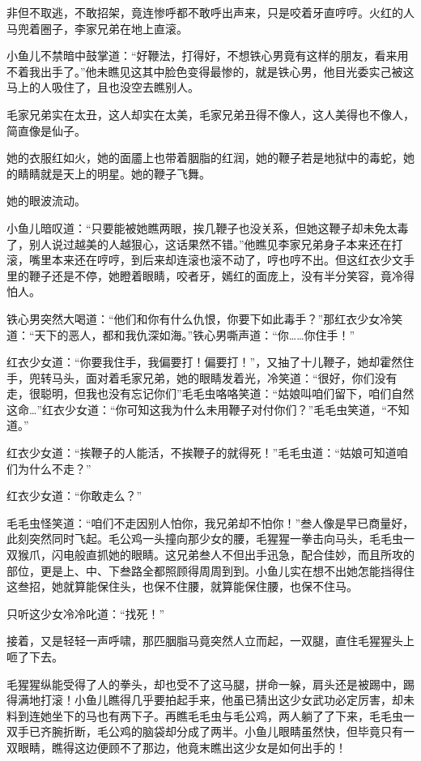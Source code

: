 \documentclass[12pt,oneside]{book}
\begin{document}
非但不取逃，不敢招架，竟连惨呼都不敢呼出声来，只是咬着牙直哼哼。火红的人马兜着圈子，李家兄弟在地上直滚。

小鱼儿不禁暗中鼓掌道：``好鞭法，打得好，不想铁心男竟有这样的朋友，看来用不着我出手了。''他未瞧见这其中脸色变得最惨的，就是铁心男，他目光委实己被这马上的人吸住了，且也没空去瞧别人。

毛家兄弟实在太丑，这人却实在太美，毛家兄弟丑得不像人，这人美得也不像人，简直像是仙子。

她的衣服红如火，她的面靥上也带着胭脂的红润，她的鞭子若是地狱中的毒蛇，她的睛睛就是天上的明星。她的鞭子飞舞。

她的眼波流动。

小鱼儿暗叹道：``只要能被她瞧两眼，挨几鞭子也没关系，但她这鞭子却未免太毒了，别人说过越美的人越狠心，这话果然不错。''他瞧见李家兄弟身子本来还在打滚，嘴里本来还在哼哼，到后来却连滚也滚不动了，哼也哼不出。但这红衣少文手里的鞭子还是不停，她瞪着眼睛，咬者牙，嫣红的面庞上，没有半分笑容，竟冷得怕人。

铁心男突然大喝道：``他们和你有什么仇恨，你要下如此毒手？''那红衣少女冷笑道：``天下的恶人，都和我仇深如海。''铁心男嘶声道：``你\ldots\ldots 你住手！''

红衣少女道：``你要我住手，我偏要打！偏要打！''，又抽了十儿鞭子，她却霍然住手，兜转马头，面对着毛家兄弟，她的眼睛发着光，冷笑道：``很好，你们没有走，很聪明，但我也没有忘记你们''毛毛虫咯咯笑道：``姑娘叫咱们留下，咱们自然这命\ldots{}''红衣少女道：``你可知这我为什么未用鞭子对付你们？''毛毛虫笑道，``不知道。''

红衣少女道：``挨鞭子的人能活，不挨鞭子的就得死！''毛毛虫道：``姑娘可知道咱们为什么不走？''

红衣少女道：``你敢走么？''

毛毛虫怪笑道：``咱们不走因别人怕你，我兄弟却不怕你！''叁人像是早已商量好，此刻突然同时飞起。毛公鸡一头撞向那少女的腰，毛猩猩一拳击向马头，毛毛虫一双猴爪，闪电般直抓她的眼睛。这兄弟叁人不但出手迅急，配合佳妙，而且所攻的部位，更是上、中、下叁路全都照顾得周周到到。小鱼儿实在想不出她怎能挡得住这叁招，她就算能保住头，也保不住腰，就算能保住腰，也保不住马。

只听这少女冷冷叱道：``找死！''

接着，又是轻轻一声呼啸，那匹胭脂马竟突然人立而起，一双腿，直住毛猩猩头上咂了下去。

毛猩猩纵能受得了人的拳头，却也受不了这马腿，拼命一躲，肩头还是被踢中，踢得满地打滚！小鱼儿瞧得几乎要拍起手来，他虽已猜出这少女武功必定厉害，却未料到连她坐下的马也有两下子。再瞧毛毛虫与毛公鸡，两人躺了了下来，毛毛虫一双手已齐腕折断，毛公鸡的脑袋却分成了两半。小鱼儿眼睛虽然快，但毕竟只有一双眼睛，瞧得这边便顾不了那边，他竟末瞧出这少女是如何出手的！
\end{document}
